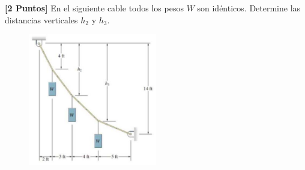 \documentclass[ a4paper, twoside, 11pt]{article}
\begin{document}
\begin{problem}
\textbf{[2 Puntos]} En el siguiente cable todos los pesos $W$ son id\'enticos. Determine las distancias verticales $h_2$ y $h_3$. 

\begin{figure}[htb]
\centering
\includegraphics[width=0.5\textwidth]{problema-2.jpg}
\end{figure}

\end{problem}
\fullskip
\end{document}
